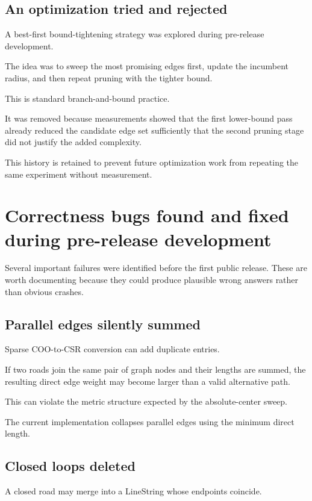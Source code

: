 \documentclass[11pt]{article}
\begin{document}
\subsection{An optimization tried and rejected}

A best-first bound-tightening strategy was explored during pre-release
development.

The idea was to sweep the most promising edges first, update the incumbent
radius, and then repeat pruning with the tighter bound.

This is standard branch-and-bound practice.

It was removed because measurements showed that the first lower-bound pass
already reduced the candidate edge set sufficiently that the second pruning
stage did not justify the added complexity.

This history is retained to prevent future optimization work from repeating the
same experiment without measurement.

\section{Correctness bugs found and fixed during pre-release development}

Several important failures were identified before the first public release.
These are worth documenting because they could produce plausible wrong answers
rather than obvious crashes.

\subsection{Parallel edges silently summed}

Sparse COO-to-CSR conversion can add duplicate entries.

If two roads join the same pair of graph nodes and their lengths are summed,
the resulting direct edge weight may become larger than a valid alternative
path.

This can violate the metric structure expected by the absolute-center sweep.

The current implementation collapses parallel edges using the minimum direct
length.

\subsection{Closed loops deleted}

A closed road may merge into a LineString whose endpoints coincide.
\end{document}
